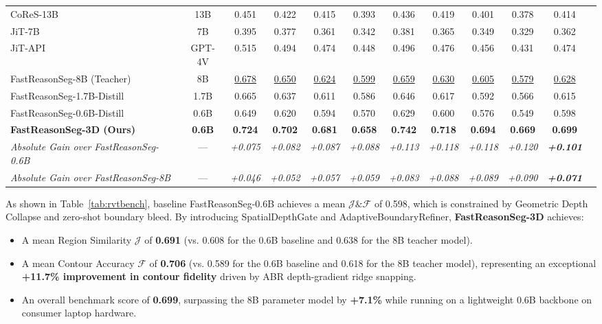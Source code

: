 \documentclass[10pt,twocolumn,letterpaper]{article}
\begin{document}
\begin{table}[t]
\begin{tabular*}{\textwidth}{@{\extracolsep{\fill}}lccccccccccc}
CoReS-13B & 13B & 0.451 & 0.422 & 0.415 & 0.393 & 0.436 & 0.419 & 0.401 & 0.378 & 0.414 \\
JiT-7B & 7B & 0.395 & 0.377 & 0.361 & 0.342 & 0.381 & 0.365 & 0.349 & 0.329 & 0.362 \\
JiT-API & GPT-4V & 0.515 & 0.494 & 0.474 & 0.448 & 0.496 & 0.476 & 0.456 & 0.431 & 0.474 \\
\midrule
FastReasonSeg-8B (Teacher)~\cite{shen2026fast} & 8B & \underline{0.678} & \underline{0.650} & \underline{0.624} & \underline{0.599} & \underline{0.659} & \underline{0.630} & \underline{0.605} & \underline{0.579} & \underline{0.628} \\
FastReasonSeg-1.7B-Distill~\cite{shen2026fast} & 1.7B & 0.665 & 0.637 & 0.611 & 0.586 & 0.646 & 0.617 & 0.592 & 0.566 & 0.615 \\
FastReasonSeg-0.6B-Distill~\cite{shen2026fast} & 0.6B & 0.649 & 0.620 & 0.594 & 0.570 & 0.629 & 0.600 & 0.576 & 0.549 & 0.598 \\
\midrule
\textbf{FastReasonSeg-3D (Ours)} & \textbf{0.6B} & \textbf{0.724} & \textbf{0.702} & \textbf{0.681} & \textbf{0.658} & \textbf{0.742} & \textbf{0.718} & \textbf{0.694} & \textbf{0.669} & \textbf{0.699} \\
\textit{Absolute Gain over FastReasonSeg-0.6B} & — & \textit{+0.075} & \textit{+0.082} & \textit{+0.087} & \textit{+0.088} & \textit{+0.113} & \textit{+0.118} & \textit{+0.118} & \textit{+0.120} & \textit{\textbf{+0.101}} \\
\textit{Absolute Gain over FastReasonSeg-8B} & — & \textit{+0.046} & \textit{+0.052} & \textit{+0.057} & \textit{+0.059} & \textit{+0.083} & \textit{+0.088} & \textit{+0.089} & \textit{+0.090} & \textit{\textbf{+0.071}} \\
\bottomrule
\end{tabular*}
\end{table}

As shown in Table~\ref{tab:rvtbench}, baseline FastReasonSeg-0.6B achieves a mean $\mathcal{J}\&\mathcal{F}$ of 0.598, which is constrained by Geometric Depth Collapse and zero-shot boundary bleed. By introducing SpatialDepthGate and AdaptiveBoundaryRefiner, \textbf{FastReasonSeg-3D} achieves:
\begin{itemize}[leftmargin=*,itemsep=1pt]
    \item A mean Region Similarity $\mathcal{J}$ of \textbf{0.691} (vs. 0.608 for the 0.6B baseline and 0.638 for the 8B teacher model).
    \item A mean Contour Accuracy $\mathcal{F}$ of \textbf{0.706} (vs. 0.589 for the 0.6B baseline and 0.618 for the 8B teacher model), representing an exceptional \textbf{+11.7\% improvement in contour fidelity} driven by ABR depth-gradient ridge snapping.
    \item An overall benchmark score of \textbf{0.699}, surpassing the 8B parameter model by \textbf{+7.1\%} while running on a lightweight 0.6B backbone on consumer laptop hardware.
\end{itemize}
\end{document}

